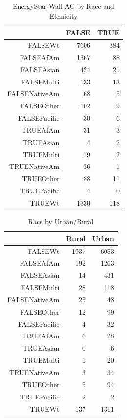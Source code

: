\documentclass{article}
\begin{document}
  


  
\begin{table}[ht]
\centering
\begin{tabular}{rrr}
  \hline
 & FALSE & TRUE \\ 
  \hline
FALSEWt & 7606 & 384 \\ 
  FALSEAfAm & 1367 &  88 \\ 
  FALSEAsian & 424 &  21 \\ 
  FALSEMulti & 133 &  13 \\ 
  FALSENativeAm &  68 &   5 \\ 
  FALSEOther & 102 &   9 \\ 
  FALSEPacific &  30 &   6 \\ 
  TRUEAfAm &  31 &   3 \\ 
  TRUEAsian &   4 &   2 \\ 
  TRUEMulti &  19 &   2 \\ 
  TRUENativeAm &  36 &   1 \\ 
  TRUEOther &  88 &  11 \\ 
  TRUEPacific &   4 &   0 \\ 
  TRUEWt & 1330 & 118 \\ 
   \hline
\end{tabular}
\caption{EnergyStar Wall AC by Race and Ethnicity} 
\label{tab:EnergyStarWall}
\end{table}

\begin{table}[ht]
\centering
\begin{tabular}{rrr}
  \hline
 & Rural & Urban \\ 
  \hline
FALSEWt & 1937 & 6053 \\ 
  FALSEAfAm & 192 & 1263 \\ 
  FALSEAsian &  14 & 431 \\ 
  FALSEMulti &  28 & 118 \\ 
  FALSENativeAm &  25 &  48 \\ 
  FALSEOther &  12 &  99 \\ 
  FALSEPacific &   4 &  32 \\ 
  TRUEAfAm &   6 &  28 \\ 
  TRUEAsian &   0 &   6 \\ 
  TRUEMulti &   1 &  20 \\ 
  TRUENativeAm &   3 &  34 \\ 
  TRUEOther &   5 &  94 \\ 
  TRUEPacific &   2 &   2 \\ 
  TRUEWt & 137 & 1311 \\ 
   \hline
\end{tabular}
\caption{Race by Urban/Rural} 
\label{tab:UrbRural}
\end{table}
\end{document}
